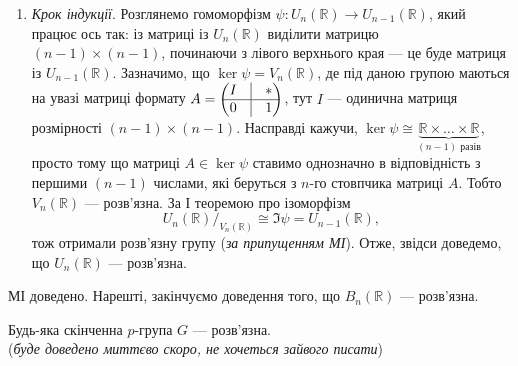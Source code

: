 \documentclass{math_library}
\begin{document}
\begin{example}
\begin{enumerate}[nosep,wide=0pt,label={\Roman*.}]
\item \textit{Крок індукції}. Розглянемо гомоморфізм $\psi \colon U_n(\mathbb{R}) \to U_{n-1}(\mathbb{R})$, який працює ось так: із матриці із $U_n(\mathbb{R})$ виділити матрицю $(n-1) \times (n-1)$, починаючи з лівого верхнього края --- це буде матриця із $U_{n-1}(\mathbb{R})$. Зазначимо, що $\ker \psi = V_n(\mathbb{R})$, де під даною групою маються на увазі матриці формату $A = \begin{pmatrix}
I & \vline & * \\
\hline
0 & \vline & 1
\end{pmatrix}$, тут $I$ --- одинична матриця розмірності $(n-1) \times (n-1)$. Насправді кажучи, $\ker \psi \cong \underbrace{\mathbb{R} \times \dots \times \mathbb{R}}_{\text{$(n-1)$ разів}}$, просто тому що матриці $A \in \ker \psi$ ставимо однозначно в відповідність з першими $(n-1)$ числами, які беруться з $n$-го стовпчика матриці $A$. Тобто $V_n(\mathbb{R})$ --- розв'язна. За І теоремою про ізоморфізм 
\[
{U_n(\mathbb{R})}/_{V_n(\mathbb{R})} \cong \Im \psi = U_{n-1}(\mathbb{R}),
\] 
тож отримали розв'язну групу (\textit{за припущенням МІ}). Отже, звідси доведемо, що $U_n(\mathbb{R})$ --- розв'язна.
\end{enumerate}
МІ доведено. Нарешті, закінчуємо доведення того, що $B_n(\mathbb{R})$ --- розв'язна.
\end{example}

\begin{theorem}
Будь-яка скінченна $p$-група $G$ --- розв'язна.\\
(\textit{буде доведено миттєво скоро, не хочеться зайвого писати})
\end{theorem}

\end{document}
